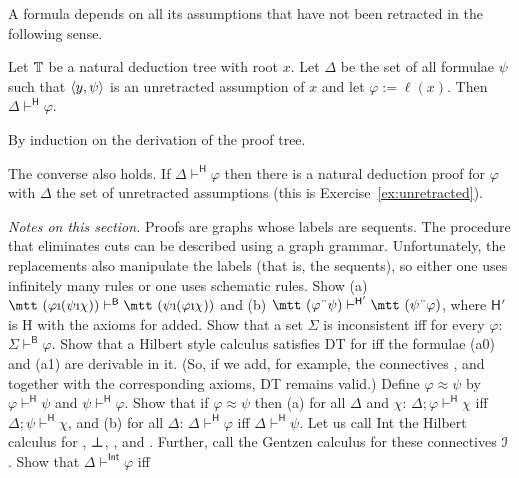 A formula depends on all its assumptions that have not been
retracted in the following sense.
\begin{lem}
Let $\mathbb{T}$ be a natural deduction tree with root $x$. Let $\Delta$
be the set of all formulae $\psi$ such that $\langle y, \psi\rangle$ is an
unretracted assumption of $x$ and let $\varphi := \ell(x)$. Then
$\Delta \vdash^{\mathsf{H}} \varphi$.
\end{lem}
\proofbeg
By induction on the derivation of the proof tree.
\proofend

The converse also holds. If $\Delta \vdash^{\mathsf{H}} \varphi$
then there is a natural deduction proof for $\varphi$ with
$\Delta$ the set of unretracted assumptions (this is 
Exercise~\ref{ex:unretracted}).

{\it Notes on this section.} Proofs are graphs whose labels are
sequents. The procedure that eliminates cuts can be described
using a graph grammar. Unfortunately, the replacements also
manipulate the labels (that is, the sequents), so either one
uses infinitely many rules or one uses schematic rules.
\vplatz%
\exercise%
Show (a) $\mbox{\mtt ($\varphi$\symbol{25}($\psi$\symbol{25}$\chi$))} 
\vdash^{\mathsf{B}} \mbox{\mtt ($\psi$\symbol{25}($\varphi$%
\symbol{25}$\chi$))}$ and (b) $\mbox{\mtt ($\varphi$\symbol{4}$\psi$)}
\vdash^{\mathsf{H'}} \mbox{\mtt ($\psi$\symbol{4}$\varphi$)}$, 
where $\mathsf{H'}$ is \textsf{H} with the axioms for {\mtt{}} 
added.
\vplatz 
\exercise 
Show that a set $\Sigma$ is inconsistent iff for every $\varphi$:  
$\Sigma \vdash^{\mathsf{B}} \varphi$.
\vplatz%
\exercise%
Show that a Hilbert style calculus satisfies DT for {\mtt{}}
iff the formulae (a0) and (a1) are derivable in it.
(So, if we add, for example, the connectives {\mtt{}}, 
{\mtt{}} and {\mtt{}} together with the corresponding 
axioms, DT remains valid.)
\vplatz%
\exercise%
Define $\varphi \approx \psi$ by $\varphi \vdash^{\mathsf{H}}
\psi$ and $\psi \vdash^{\mathsf{H}} \varphi$. Show that if
$\varphi \approx \psi$ then (a) for all $\Delta$ and $\chi$:
$\Delta; \varphi \vdash^{\mathsf{H}} \chi$ iff
$\Delta;\psi \vdash^{\mathsf{H}} \chi$, and (b) for all $\Delta$:
$\Delta \vdash^{\mathsf{H}} \varphi$ iff $\Delta
\vdash^{\mathsf{H}} \psi$.
\vplatz%
\exercise%
Let us call \textsf{Int} 
the Hilbert calculus for {\mtt{}}, 
$\boldsymbol{\bot}$, {\mtt{}}, {\mtt{}} and {\mtt{}}. 
Further, call the Gentzen calculus for these connectives $\mathcal{I}$. Show 
that $\Delta \vdash^{\mathsf{Int}} \varphi$ iff 

